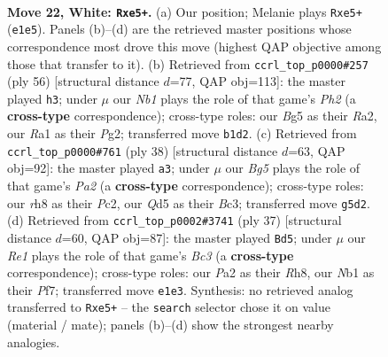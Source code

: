 \documentclass[11pt]{article}
\begin{document}
\clearpage

\begin{figure}[p]\centering
\begin{subfigure}{0.46\textwidth}\centering
\resizebox{\linewidth}{!}{%
\newchessgame
\chessboard[
  setfen={1rb1kb1r/2q3pp/1p6/p2Qp1B1/3p3P/8/PP3PP1/RN2R1K1 w - - 6 22},
  showmover=false,
  pgfstyle=straightmove, color=movearrow, markmove={e1-e5}
]}
\caption{}
\end{subfigure}\hfill
\begin{subfigure}{0.46\textwidth}\centering
\resizebox{\linewidth}{!}{%
\newchessgame
\chessboard[
  setfen={1r1q2k1/r5bp/PpQp2p1/2pPp3/8/4B3/R4PPP/1R4K1 w - - 7 29},
  showmover=false,
  pgfstyle=straightmove, color=movearrow, markmove={h2-h3}
]}
\caption{}
\end{subfigure}
\\[4pt]
\begin{subfigure}{0.46\textwidth}\centering
\resizebox{\linewidth}{!}{%
\newchessgame
\chessboard[
  setfen={1rb2rk1/p1q1b1p1/2p2pQp/4p3/8/2BR4/PPPN1PPP/2K4R w - - 2 20},
  showmover=false,
  pgfstyle=straightmove, color=movearrow, markmove={a2-a3}
]}
\caption{}
\end{subfigure}\hfill
\begin{subfigure}{0.46\textwidth}\centering
\resizebox{\linewidth}{!}{%
\newchessgame
\chessboard[
  setfen={r3k2r/5pp1/pBb1p2p/8/1b3qP1/5P2/1PP2Q1P/1K1R1BR1 b kq - 3 19},
  showmover=false,
  pgfstyle=straightmove, color=movearrow, markmove={c6-d5}
]}
\caption{}
\end{subfigure}
\caption{\textbf{Move 22, White: \texttt{Rxe5+}.} (a) Our position; Melanie plays \texttt{Rxe5+} (\texttt{e1e5}). Panels (b)--(d) are the retrieved master positions whose correspondence most drove this move (highest QAP objective among those that transfer to it). (b) Retrieved from \texttt{ccrl\_top\_p0000\#257} (ply 56) [structural distance $d$=77, QAP obj=113]: the master played \texttt{h3}; under $\mu$ our \emph{Nb1} plays the role of that game's \emph{Ph2} (a \textbf{cross-type} correspondence); cross-type roles: our \emph{B}g5 as their \emph{R}a2, our \emph{R}a1 as their \emph{P}g2; transferred move \texttt{b1d2}. (c) Retrieved from \texttt{ccrl\_top\_p0000\#761} (ply 38) [structural distance $d$=63, QAP obj=92]: the master played \texttt{a3}; under $\mu$ our \emph{Bg5} plays the role of that game's \emph{Pa2} (a \textbf{cross-type} correspondence); cross-type roles: our \emph{r}h8 as their \emph{P}c2, our \emph{Q}d5 as their \emph{B}c3; transferred move \texttt{g5d2}. (d) Retrieved from \texttt{ccrl\_top\_p0002\#3741} (ply 37) [structural distance $d$=60, QAP obj=87]: the master played \texttt{Bd5}; under $\mu$ our \emph{Re1} plays the role of that game's \emph{Bc3} (a \textbf{cross-type} correspondence); cross-type roles: our \emph{P}a2 as their \emph{R}h8, our \emph{N}b1 as their \emph{P}f7; transferred move \texttt{e1e3}. Synthesis: no retrieved analog transferred to \texttt{Rxe5+} -- the \texttt{search} selector chose it on value (material / mate); panels (b)--(d) show the strongest nearby analogies.}
\label{fig:thought-m42}
\end{figure}
\end{document}
